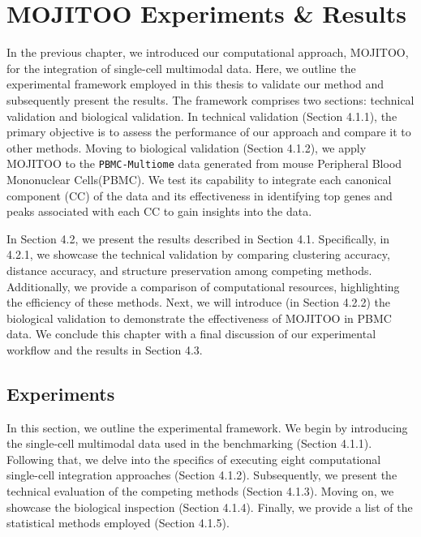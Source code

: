 %
\chapter{MOJITOO Experiments \& Results }
\label{chapter:MOJITOO_bench}

\graphicspath{{chapter4/figs}}
In the previous chapter, we introduced our computational approach, MOJITOO, for the integration of single-cell multimodal data. Here, we outline the experimental framework employed in this thesis to validate our method and subsequently present the results. The framework comprises two sections: technical validation and biological validation. In technical validation (Section 4.1.1), the primary objective is to assess the performance of our approach and compare it to other methods. Moving to biological validation (Section 4.1.2), we apply MOJITOO to the \texttt{PBMC-Multiome} data generated from mouse Peripheral Blood Mononuclear Cells(PBMC). We test its capability to integrate each canonical component (CC) of the data and its effectiveness in identifying top genes and peaks associated with each CC to gain insights into the data.

In Section 4.2, we present the results described in Section 4.1. Specifically, in 4.2.1, we showcase the technical validation by comparing clustering accuracy, distance accuracy, and structure preservation among competing methods. Additionally, we provide a comparison of computational resources, highlighting the efficiency of these methods. Next, we will introduce (in Section 4.2.2) the biological validation to demonstrate the effectiveness of MOJITOO in PBMC data. We conclude this chapter with a final discussion of our experimental workflow and the results in Section 4.3.


\section{Experiments}
\label{MOJITOO:exp}
In this section, we outline the experimental framework. We begin by introducing the single-cell multimodal data used in the benchmarking (Section 4.1.1). Following that, we delve into the specifics of executing eight computational single-cell integration approaches (Section 4.1.2). Subsequently, we present the technical evaluation of the competing methods (Section 4.1.3). Moving on, we showcase the biological inspection (Section 4.1.4). Finally, we provide a list of the statistical methods employed (Section 4.1.5).

